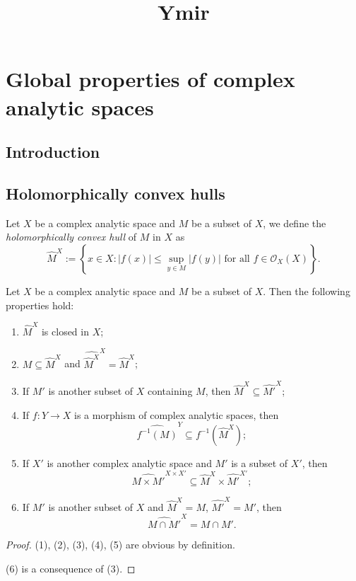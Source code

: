 
\title{Ymir}

\maketitle
\tableofcontents

\chapter*{Global properties of complex analytic spaces}\label{chap-CGlobalProperty}

\section{Introduction}\label{sec-introduction-CGlobalProperty}

\section{Holomorphically convex hulls}

\begin{definition}
    Let $X$ be a complex analytic space and $M$ be a subset of $X$, we define the \emph{holomorphically convex hull} of $M$ in $X$ as
    \[
        \hat{M}^X:=  \left\{ x\in X: |f(x)|\leq \sup_{y\in M}|f(y)|\text{ for all }f\in \mathcal{O}_X(X) \right\}.  
    \]
\end{definition}

\begin{proposition}\label{prop-convexhullprop}
    Let $X$ be a complex analytic space and $M$ be a subset of $X$. Then the following properties hold:
    \begin{enumerate}
        \item $\hat{M}^X$ is closed in $X$;
        \item $M\subseteq \hat{M}^X$ and $\widehat{\hat{M}^X}^X=\hat{M}^X$;
        \item If $M'$ is another subset of $X$ containing $M$, then $\hat{M}^X\subseteq \hat{M'}^X$;
        \item If $f:Y\rightarrow X$ is a morphism of complex analytic spaces, then
             \[ 
                \widehat{f^{-1}(M)}^Y\subseteq f^{-1}(\hat{M}^X);
             \]
        \item If $X'$ is another complex analytic space and $M'$ is a subset of $X'$, then
            \[
                \widehat{M\times M'}^{X\times X'}\subseteq \hat{M}^X\times \hat{M'}^{X'};  
            \]
        \item If $M'$ is another subset of $X$ and $\hat{M}^X=M$, $\hat{M'}^X=M'$, then
            \[
                \widehat{M\cap M'}^X=M\cap M'.    
            \]
    \end{enumerate}
\end{proposition}
\begin{proof}
    (1), (2), (3), (4), (5) are obvious by definition.

    (6) is a consequence of (3).
\end{proof}

